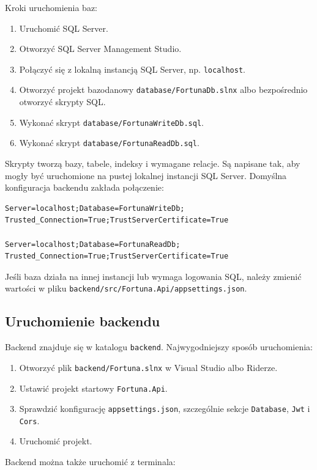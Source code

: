 \documentclass[12pt,a4paper]{article}
\begin{document}
Kroki uruchomienia baz:
\begin{enumerate}[nosep]
    \item Uruchomić SQL Server.
    \item Otworzyć SQL Server Management Studio.
    \item Połączyć się z lokalną instancją SQL Server, np. \texttt{localhost}.
    \item Otworzyć projekt bazodanowy \texttt{database/FortunaDb.slnx} albo bezpośrednio otworzyć skrypty SQL.
    \item Wykonać skrypt \texttt{database/FortunaWriteDb.sql}.
    \item Wykonać skrypt \texttt{database/FortunaReadDb.sql}.
\end{enumerate}

Skrypty tworzą bazy, tabele, indeksy i wymagane relacje. Są napisane tak, aby mogły być uruchomione na pustej lokalnej instancji SQL Server. Domyślna konfiguracja backendu zakłada połączenie:

\begin{verbatim}
Server=localhost;Database=FortunaWriteDb;
Trusted_Connection=True;TrustServerCertificate=True

Server=localhost;Database=FortunaReadDb;
Trusted_Connection=True;TrustServerCertificate=True
\end{verbatim}

Jeśli baza działa na innej instancji lub wymaga logowania SQL, należy zmienić wartości w pliku \texttt{backend/src/Fortuna.Api/appsettings.json}.

\subsection{Uruchomienie backendu}

Backend znajduje się w katalogu \texttt{backend}. Najwygodniejszy sposób uruchomienia:
\begin{enumerate}[nosep]
    \item Otworzyć plik \texttt{backend/Fortuna.slnx} w Visual Studio albo Riderze.
    \item Ustawić projekt startowy \texttt{Fortuna.Api}.
    \item Sprawdzić konfigurację \texttt{appsettings.json}, szczególnie sekcje \texttt{Database}, \texttt{Jwt} i \texttt{Cors}.
    \item Uruchomić projekt.
\end{enumerate}

Backend można także uruchomić z terminala:
\end{document}
